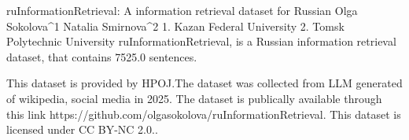 
ruInformationRetrieval: A information retrieval dataset for Russian
Olga Sokolova^1 Natalia Smirnova^2
1. Kazan Federal University 2. Tomsk Polytechnic University
ruInformationRetrieval, is a Russian information retrieval dataset, that contains 7525.0 sentences.

This dataset is provided by HPOJ.The dataset was collected from LLM generated of wikipedia, social media in 2025. 
The dataset is publically available through this link https://github.com/olgasokolova/ruInformationRetrieval. This dataset is licensed under CC BY-NC 2.0..

